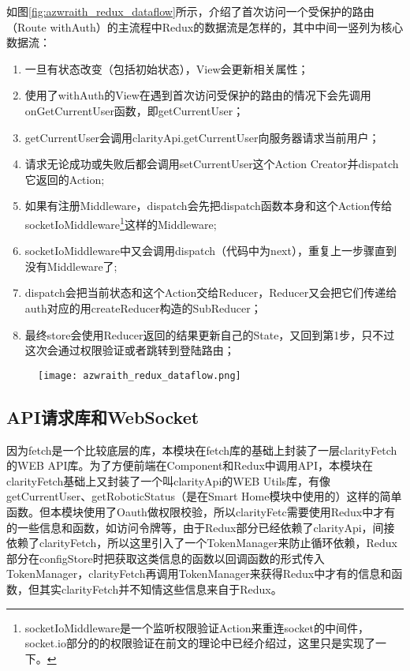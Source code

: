 如图\ref{fig:azwraith_redux_dataflow}所示，介绍了首次访问一个受保护的路由（Route withAuth）的主流程中Redux的数据流是怎样的，其中中间一竖列为核心数据流：
\begin{enumerate}
  \item 一旦有状态改变（包括初始状态），View会更新相关属性；
  \item 使用了withAuth的View在遇到首次访问受保护的路由的情况下会先调用onGetCurrentUser函数，即getCurrentUser；
  \item getCurrentUser会调用clarityApi.getCurrentUser向服务器请求当前用户；
  \item 请求无论成功或失败后都会调用setCurrentUser这个Action Creator并dispatch它返回的Action;
  \item 如果有注册Middleware，dispatch会先把dispatch函数本身和这个Action传给socketIoMiddleware\footnote{socketIoMiddleware是一个监听权限验证Action来重连socket的中间件，socket.io部分的的权限验证在前文的理论中已经介绍过，这里只是实现了一下。}这样的Middleware;
  \item socketIoMiddleware中又会调用dispatch（代码中为next），重复上一步骤直到没有Middleware了;
  \item dispatch会把当前状态和这个Action交给Reducer，Reducer又会把它们传递给auth对应的用createReducer构造的SubReducer；
  \item 最终store会使用Reducer返回的结果更新自己的State，又回到第1步，只不过这次会通过权限验证或者跳转到登陆路由；
\end{enumerate}

\begin{figure}[!htp]
 \centering
 \texttt{[image: azwraith\_redux\_dataflow.png]}
\end{figure}

\subsection{API请求库和WebSocket}
因为fetch是一个比较底层的库，本模块在fetch库的基础上封装了一层clarityFetch的WEB API库。为了方便前端在Component和Redux中调用API，本模块在clarityFetch基础上又封装了一个叫clarityApi的WEB Utils库，有像getCurrentUser、getRoboticStatus（是在Smart Home模块中使用的）这样的简单函数。但本模块使用了Oauth做权限校验，所以clarityFetc需要使用Redux中才有的一些信息和函数，如访问令牌等，由于Redux部分已经依赖了clarityApi，间接依赖了clarityFetch，所以这里引入了一个TokenManager来防止循环依赖，Redux部分在configStore时把获取这类信息的函数以回调函数的形式传入TokenManager，clarityFetch再调用TokenManager来获得Redux中才有的信息和函数，但其实clarityFetch并不知情这些信息来自于Redux。


